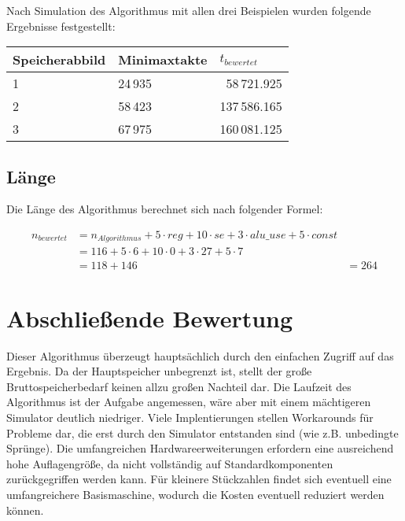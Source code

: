 Nach Simulation des Algorithmus mit allen drei Beispielen wurden folgende Ergebnisse festgestellt:

\begin{center}
    \begin{tabular}{|l|l|r|}
        \hline
        Speicherabbild & Minimaxtakte & \multicolumn{1}{l|}{$t_{bewertet}$} \\
        \hline
        \hline
        1 & 24\,935 & 58\,721.925 \\
        \hline
        2 & 58\,423 & 137\,586.165 \\
        \hline
        3 & 67\,975 & 160\,081.125 \\
        \hline
    \end{tabular}
\end{center}

\subsection{Länge}
\label{subsection:Dokumentation-BenchmarkBewertung-Berechnung-Laenge}

Die Länge des Algorithmus berechnet sich nach folgender Formel:

\begin{align*}
    n_{bewertet} &= n_{Algorithmus} + 5 \cdot reg + 10 \cdot se + 3 \cdot alu\_use + 5 \cdot const \\
                 &= 116 + 5 \cdot 6 + 10 \cdot 0 + 3 \cdot 27 + 5 \cdot 7 \\
                 &= 118 + 146
                 &= 264
\end{align*}

\section{Abschließende Bewertung}
\label{section:Dokumentation-BenchmarkBewertung-Bewertung}

Dieser Algorithmus überzeugt hauptsächlich durch den einfachen Zugriff auf das Ergebnis. Da der Hauptspeicher unbegrenzt ist, stellt der große Bruttospeicherbedarf keinen allzu großen Nachteil dar. Die Laufzeit des Algorithmus ist der Aufgabe angemessen, wäre aber mit einem mächtigeren Simulator deutlich niedriger. Viele Implentierungen stellen Workarounds für Probleme dar, die erst durch den Simulator entstanden sind (wie z.B. unbedingte Sprünge). Die umfangreichen Hardwareerweiterungen erfordern eine ausreichend hohe Auflagengröße, da nicht vollständig auf Standardkomponenten zurückgegriffen werden kann. Für kleinere Stückzahlen findet sich eventuell eine umfangreichere Basismaschine, wodurch die Kosten eventuell reduziert werden können.

